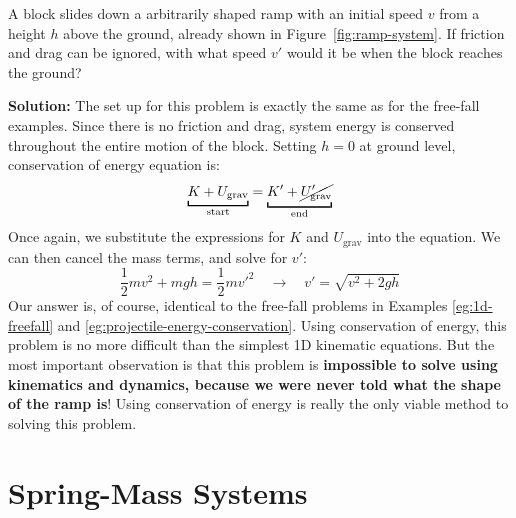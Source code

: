 \begin{example}
  A block slides down a arbitrarily shaped ramp with an initial speed $v$ from
  a height $h$ above the ground, already shown in Figure~\ref{fig:ramp-system}.
  If friction and drag can be ignored, with what speed $v'$ would it be when the
  block reaches the ground?
  
  \textbf{Solution:} The set up for this problem is exactly the same as for
  the free-fall examples. Since there is no friction and drag, system energy is
  conserved throughout the entire motion of the block. Setting $h=0$ at ground
  level, conservation of energy equation is:
  \begin{displaymath}
    \underbracket[1pt]{K + U_\text{grav}}_\text{start} =
    \underbracket[1pt]{K' + \cancel{U_\text{grav}'}}_\text{end}
  \end{displaymath}
  Once again, we substitute the expressions for $K$ and $U_\text{grav}$ into
  the equation. We can then cancel the mass terms, and solve for $v'$:
  \begin{displaymath}
    \frac12 mv^2 + mgh = \frac12 mv'^2
    \quad\longrightarrow\quad
    v'= \sqrt{v^2+2gh}
  \end{displaymath}
  Our answer is, of course, identical to the free-fall problems in Examples
  \ref{eg:1d-freefall} and \ref{eg:projectile-energy-conservation}. Using
  conservation of energy, this problem is no more difficult than the simplest
  1D kinematic equations. But the most important observation is that this
  problem is \textbf{impossible to solve using kinematics and dynamics, because
    we were never told what the shape of the ramp is}! Using conservation of
  energy is really the only viable method to solving this problem.
\end{example}




\section{Spring-Mass Systems}


